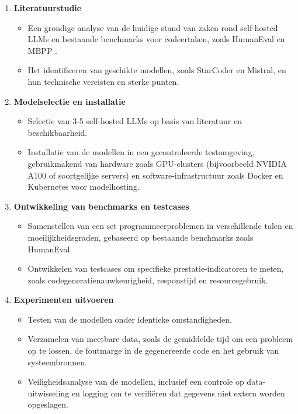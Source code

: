 \begin{enumerate}
    \item \textbf{Literatuurstudie}
    \begin{itemize}
        \item Een grondige analyse van de huidige stand van zaken rond self-hosted LLMs en bestaande benchmarks voor codeertaken, zoals HumanEval en MBPP \autocite{Chen2021}.
        \item Het identificeren van geschikte modellen, zoals StarCoder en Mistral, en hun technische vereisten en sterke punten.
    \end{itemize}

    \item \textbf{Modelselectie en installatie}
    \begin{itemize}
        \item Selectie van 3-5 self-hosted LLMs op basis van literatuur en beschikbaarheid.
        \item Installatie van de modellen in een gecontroleerde testomgeving, gebruikmakend van hardware zoals GPU-clusters (bijvoorbeeld NVIDIA A100 of soortgelijke servers) en software-infrastructuur zoals Docker en Kubernetes voor modelhosting.
    \end{itemize}

    \item \textbf{Ontwikkeling van benchmarks en testcases}
    \begin{itemize}
        \item Samenstellen van een set programmeerproblemen in verschillende talen en moeilijkheidsgraden, gebaseerd op bestaande benchmarks zoals HumanEval.
        \item Ontwikkelen van testcases om specifieke prestatie-indicatoren te meten, zoals codegeneratienauwkeurigheid, responstijd en resourcegebruik.
    \end{itemize}

    \item \textbf{Experimenten uitvoeren}
    \begin{itemize}
        \item Testen van de modellen onder identieke omstandigheden.
        \item Verzamelen van meetbare data, zoals de gemiddelde tijd om een probleem op te lossen, de foutmarge in de gegenereerde code en het gebruik van systeembronnen.
        \item Veiligheidsanalyse van de modellen, inclusief een controle op data-uitwisseling en logging om te verifiëren dat gegevens niet extern worden opgeslagen.
    \end{itemize}


\end{enumerate}
